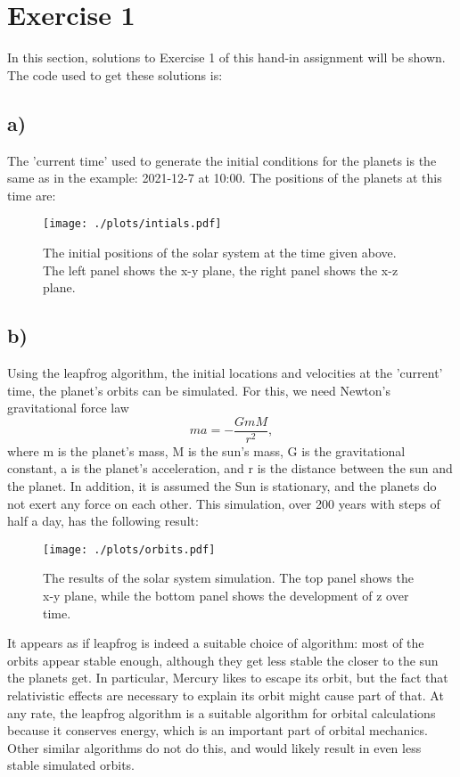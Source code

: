 \section{Exercise 1}
In this section, solutions to Exercise 1 of this hand-in assignment will be shown. The code used to get these solutions is:


\subsection*{a)}
The 'current time' used to generate the initial conditions for the planets is the same as in the example: 2021-12-7 at 10:00. The positions of the planets at this time are:
\begin{figure}
    \centering
    \texttt{[image: ./plots/intials.pdf]}
    \caption{The initial positions of the solar system at the time given above. The left panel shows the x-y plane, the right panel shows the x-z plane.}
    \label{fig:initial}
\end{figure}
\subsection*{b)}
Using the leapfrog algorithm, the initial locations and velocities at the 'current' time, the planet's orbits can be simulated. For this, we need Newton's gravitational force law
\begin{equation}
    ma = -\frac{GmM}{r^2},
\end{equation}
where m is the planet's mass, M is the sun's mass, G is the gravitational constant, a is the planet's acceleration, and r is the distance between the sun and the planet. In addition, it is assumed the Sun is stationary, and the planets do not exert any force on each other. This simulation, over 200 years with steps of half a day, has the following result:
\begin{figure}
    \centering
    \texttt{[image: ./plots/orbits.pdf]}
    \caption{The results of the solar system simulation. The top panel shows the x-y plane, while the bottom panel shows the development of z over time.}
    \label{fig:orbits}
\end{figure}
It appears as if leapfrog is indeed a suitable choice of algorithm: most of the orbits appear stable enough, although they get less stable the closer to the sun the planets get. In particular, Mercury likes to escape its orbit, but the fact that relativistic effects are necessary to explain its orbit might cause part of that. 
At any rate, the leapfrog algorithm is a suitable algorithm for orbital calculations because it conserves energy, which is an important part of orbital mechanics. Other similar algorithms do not do this, and would likely result in even less stable simulated orbits.